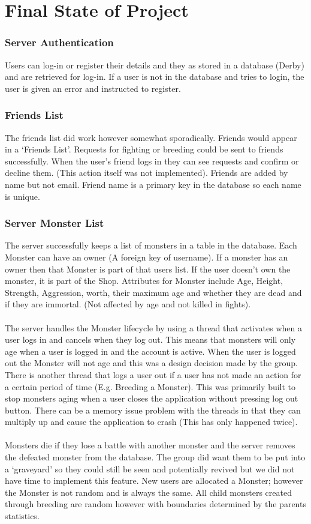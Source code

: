 \documentclass[titlepage]{article}
\begin{document}
{\section {Final State of Project}

\subsubsection {Server Authentication}
Users can log-in or register their details and they as stored in a database (Derby) and are retrieved for log-in. If a user is not in the database and tries to login, the user is given an error and instructed to register.

\subsubsection{Friends List}
The friends list did work however somewhat sporadically. Friends would appear in a ‘Friends List’. Requests for fighting or breeding could be sent to friends successfully. When the user's friend logs in they can see requests and confirm or decline them. (This action itself was not implemented). Friends are added by name but not email. Friend name is a primary key in the database so each name is unique.

\subsubsection{Server Monster List}
The server successfully keeps a list of monsters in a table in the database. Each Monster can have an owner (A foreign key of username). If a monster has an owner then that Monster is part of that users list. If the user doesn't own the monster, it is part of the Shop. Attributes for Monster include Age, Height, Strength, Aggression, worth, their maximum age and whether they are dead and if they are immortal. (Not affected by age and not killed in fights).
\\
\\
The server handles the Monster lifecycle by using a thread that activates when a user logs in and cancels when they log out. This means that monsters will only age when a user is logged in and the account is active. When the user is logged out the Monster will not age and this was a design decision made by the group. There is another thread that logs a user out if a user has not made an action for a certain period of time (E.g. Breeding a Monster). This was primarily built to stop monsters aging when a user closes the application without pressing log out button. There can be a memory issue problem with the threads in that they can multiply up and cause the application to crash (This has only happened twice).
\\
\\
Monsters die if they lose a battle with another monster and the server removes the defeated monster from the database. The group did want them to be put into a ‘graveyard’ so they could still be seen and potentially revived but we did not have time to implement this feature.
New users are allocated a Monster; however the Monster is not random and is always the same. All child monsters created through breeding are random however with boundaries determined by the parents statistics.
}
\end{document}
